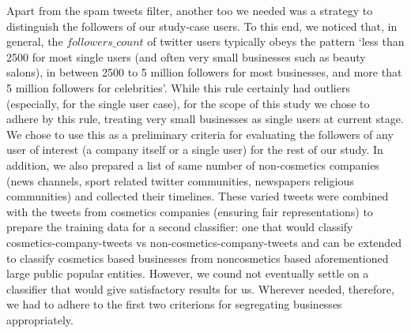 \documentclass[11pt]{article}
\begin{document}
Apart from the spam tweets filter, another too we needed
was a strategy to distinguish the followers of our study-case users. To this end, we noticed that,
in general, the $followers\_count$ of twitter users typically obeys the pattern `less than 2500 for
most single users (and often very small businesses such as beauty salons), in between 2500 to
5 million followers for most businesses, and more that 5 million followers for celebrities'.
While this rule certainly had outliers (especially, for the single user case), 
for the scope of this study we chose to adhere by this rule, treating very small businesses as
single users at current stage.
We chose to use this as a preliminary criteria for evaluating the followers of any user of interest
(a company itself or a single user) for the rest of our study. In addition,
we also prepared a list of same number of non-cosmetics companies (news channels, 
sport related twitter communities, newspapers religious communities) and collected their
timelines. These varied tweets were combined with the tweets from cosmetics companies (ensuring 
fair representations) to prepare the training data for a second classifier: one that would classify
cosmetics-company-tweets vs non-cosmetics-company-tweets and can be extended to classify cosmetics
based businesses from noncosmetics based aforementioned large public popular entities. However,
we cound not eventually settle on a classifier that would give satisfactory results for us. Wherever needed,
therefore, we had to adhere to the first two criterions for segregating businesses appropriately.
\end{document}

